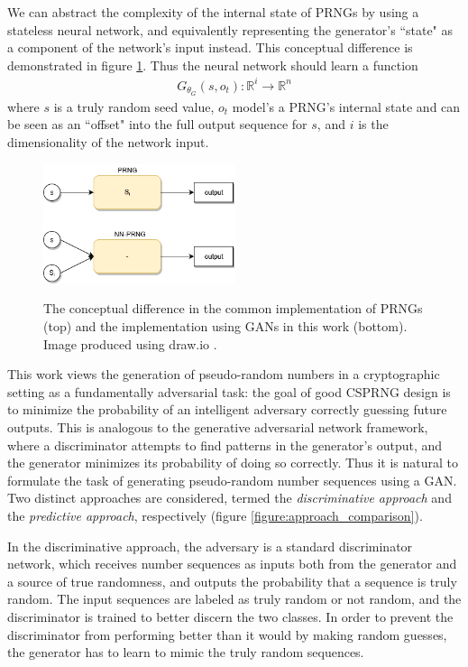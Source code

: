 \documentclass[12pt, titlepage]{report}
\theoremstyle{definition}
\begin{document}
We can abstract the complexity of the internal state of PRNGs by using a stateless neural network, and equivalently representing the generator's ``state" as a component of the network's input instead. This conceptual difference is demonstrated in figure \ref{figure:conceptual_difference}. Thus the neural network should learn a function
\begin{gather}
G_{\theta_{G}}(s, o_t) : \mathbb{R}^i \rightarrow \mathbb{R}^n
\end{gather}
where $s$ is a truly random seed value, $o_t$ model's a PRNG's internal state and can be seen as an ``offset" into the full output sequence for $s$, and $i$ is the dimensionality of the network input.

\begin{figure}
\centering
\includegraphics[width=0.5\textwidth]{img/conceptual_design.png}\\
\caption{The conceptual difference in the common implementation of PRNGs (top) and the implementation using GANs in this work (bottom). Image produced using draw.io \cite{jgraph2018draw}.}
\label{figure:conceptual_difference}
\end{figure}

This work views the generation of pseudo-random numbers in a cryptographic setting as a fundamentally adversarial task: the goal of good CSPRNG design is to minimize the probability of an intelligent adversary correctly guessing future outputs. This is analogous to the generative adversarial network framework, where a discriminator attempts to find patterns in the generator's output, and the generator minimizes its probability of doing so correctly. Thus it is natural to formulate the task of generating pseudo-random number sequences using a GAN. Two distinct approaches are considered, termed the \textit{discriminative approach} and the \textit{predictive approach}, respectively (figure \ref{figure:approach_comparison}). 

In the discriminative approach, the adversary is a standard discriminator network, which receives number sequences as inputs both from the generator and a source of true randomness, and outputs the probability that a sequence is truly random. The input sequences are labeled as truly random or not random, and the discriminator is trained to better discern the two classes. In order to prevent the discriminator from performing better than it would by making random guesses, the generator has to learn to mimic the truly random sequences.
\end{document}
